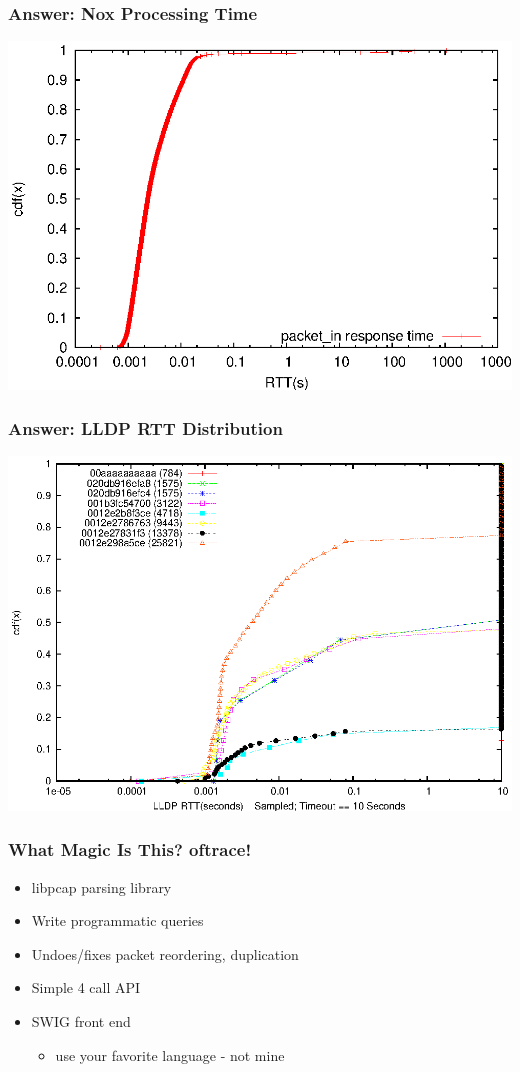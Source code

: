 \documentclass[14pt]{beamer}
\newcommand{\subbullet}[1]{\begin{itemize}\item #1\end{itemize}}
\begin{document}
\begin{frame}
\frametitle{Answer: Nox Processing Time}
\begin{center}
\includegraphics[width=\textwidth]{figures/ofstats_mixed}
\end{center}
\end{frame}
\begin{frame}
\frametitle{Answer: LLDP RTT Distribution}
\begin{center}
\includegraphics[width=\textwidth]{figures/lldp_by_switch}
\end{center}
\end{frame}
\begin{frame}
\frametitle{What Magic Is This? oftrace!}
\begin{itemize}
\item libpcap parsing library
\item Write programmatic queries 
\item Undoes/fixes packet reordering, duplication
\item Simple 4 call API
\item SWIG front end
\subbullet{use your favorite language - not mine}
\end{itemize}
\end{frame}
\end{document}
